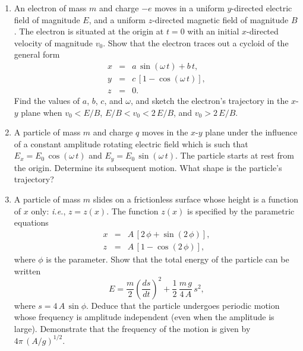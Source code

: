 {\small
\renewcommand{\theenumi}{4.\arabic{enumi}}
\begin{enumerate}
\item An electron of mass $m$ and charge $-e$ moves in a uniform $y$-directed electric field of magnitude $E$,
and a uniform $z$-directed magnetic field of magnitude $B$. The electron is situated at the
origin at $t=0$ with an initial $x$-directed velocity of magnitude $v_0$. Show that the
electron traces out a cycloid of the general form
\begin{eqnarray}
x &=& a\,\sin(\omega\,t) + b\,t,\nonumber\\[0.5ex]
y &=& c\,[1-\cos(\omega\,t)],\nonumber\\[0.5ex]
z &=& 0.\nonumber
\end{eqnarray}
Find the values of $a$, $b$, $c$, and $\omega$, and sketch the electron's trajectory
in the $x$-$y$ plane when $v_0<E/B$, $E/B < v_0 < 2\,E/B$, and
$v_0> 2\,E/B$.

\item A particle of mass $m$ and charge $q$ moves in the $x$-$y$ plane
under the influence of a constant amplitude rotating electric field
which is such that $E_x= E_0\,\cos(\omega\,t)$ and $E_y=E_0\,\sin(\omega\,t)$. The particle starts at rest from the origin. Determine its subsequent motion. What shape is the particle's trajectory?

\item A particle of mass $m$ slides on a frictionless surface whose height is a
function of $x$ only: {\em i.e.}, $z=z(x)$. The function $z(x)$
is specified by the parametric equations
\begin{eqnarray}
x&= &A\,[2\,\phi + \sin (2\,\phi)],\nonumber\\[0.5ex]
z& = &A\,[1-\cos (2\,\phi)],\nonumber
\end{eqnarray}
where $\phi$ is the parameter. Show that the total energy of the
particle can be written
$$
E = \frac{m}{2}\left(\frac{ds}{dt}\right)^{2} + \frac{1}{2}\,\frac{m\,g}{4\,A}\,s^2,
$$
where $s=4\,A\,\sin\phi$. Deduce that the particle undergoes periodic
motion whose frequency is amplitude independent (even when the amplitude
is large). Demonstrate that the frequency of the motion is given by $4\pi\,(A/g)^{1/2}$. 
\end{enumerate}
}